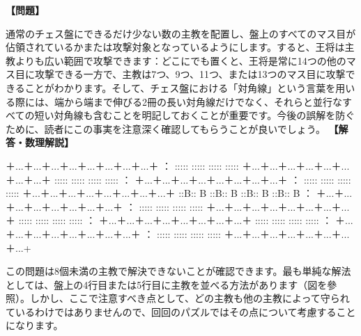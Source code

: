 \documentclass[10pt,a4paper,oneside,openany]{ltjsbook}
\begin{document}
\begin{tcolorbox}[colback=softblue,colframe=primaryblue,title=\textbf{第 297 問：主教を配置する（守られない） （原題: BISHOPS--UNGUARDED.）},arc=2mm,boxrule=1pt,breakable]
\textbf{【問題】}\par\vspace{0.3em}
通常のチェス盤にできるだけ少ない数の主教を配置し、盤上のすべてのマス目が佔領されているかまたは攻撃対象となっているようにします。すると、王将は主教よりも広い範囲で攻撃できます：どこにでも置くと、王将是常に14つの他のマス目に攻撃できる一方で、主教は7つ、9つ、11つ、または13つのマス目に攻撃できることがわかります。そして、チェス盤における「対角線」という言葉を用いる際には、端から端まで伸びる2冊の長い対角線だけでなく、それらと並行なすべての短い対角線も含むことを明記しておくことが重要です。今後の誤解を防ぐために、読者にこの事実を注意深く確認してもらうことが良いでしょう。
\tcblower
\textbf{【解答・数理解説】}\par\vspace{0.3em}
＋...＋...＋...＋...＋...＋...＋...＋...＋
    ：   :::::   :::::   :::::   :::::
    ＋...＋...＋...＋...＋...＋...＋...＋...＋
    :::::   :::::   :::::   :::::   ：
    ＋...＋...＋...＋...＋...＋...＋...＋...＋
    ：   :::::   :::::   :::::   :::::
    ＋...＋...＋...＋...＋...＋...＋...＋...＋
    ::B:: B ::B:: B ::B:: B ::B:: B ：
    ＋...＋...＋...＋...＋...＋...＋...＋...＋
    ：   :::::   :::::   :::::   :::::
    ＋...＋...＋...＋...＋...＋...＋...＋...＋
    :::::   :::::   :::::   :::::   ：
    ＋...＋...＋...＋...＋...＋...＋...＋...＋
    :::::   :::::   :::::   :::::   ：
    ＋...＋...＋...＋...＋...＋...＋...＋...＋
    ：   :::::   :::::   :::::   :::::
    ＋...＋...＋...＋...＋...＋...＋...＋...+

この問題は8個未満の主教で解決できないことが確認できます。最も単純な解法としては、盤上の4行目または5行目に主教を並べる方法があります（図を參照）。しかし、ここで注意すべき点として、どの主教も他の主教によって守られているわけではありませんので、回回のパズルではその点について考慮することになります。
\end{tcolorbox}
\end{document}
